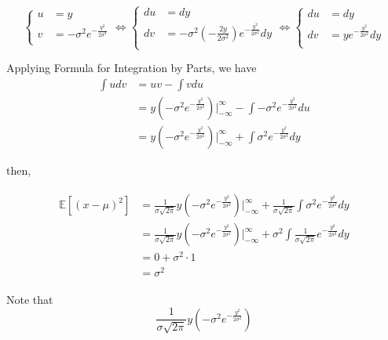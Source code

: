 \begin{equation}
    \begin{cases}
      u & = y\\
      v & = - \sigma ^ 2 e^{- \frac{y^2}{2 \sigma^2}}\\
    \end{cases}
    \Leftrightarrow
    \begin{cases}
      du & = dy\\
      dv & = - \sigma ^ 2 (-\frac{2y}{2 \sigma ^2}) e^{- \frac{y^2}{2 \sigma^2}}dy\\
    \end{cases}
    \Leftrightarrow
    \begin{cases}
      du & = dy\\
      dv & = y e^{- \frac{y^2}{2 \sigma^2}}dy\\
    \end{cases}
\end{equation}

Applying Formula for Integration by Parts, we have
\begin{equation}
    \begin{split}
        \int u dv & = u v - \int v du\\
        & = y (- \sigma ^ 2 e^{- \frac{y^2}{2 \sigma^2}})|_{- \infty}^{\infty} - \int - \sigma ^ 2 e^{- \frac{y^2}{2 \sigma^2}}du\\
        & = y (- \sigma ^ 2 e^{- \frac{y^2}{2 \sigma^2}})|_{- \infty}^{\infty} + \int \sigma ^ 2 e^{- \frac{y^2}{2 \sigma^2}}dy
    \end{split}
\end{equation}

then,

\begin{align}
    \begin{split}
        \mathbb{E}[(x - \mu)^2] & = \frac{1}{\sigma\sqrt{2\pi}}y (- \sigma ^ 2 e^{- \frac{y^2}{2 \sigma^2}})|_{- \infty}^{\infty} + \frac{1}{\sigma\sqrt{2\pi}}\int \sigma ^ 2 e^{- \frac{y^2}{2 \sigma^2}}dy\\
        & = \frac{1}{\sigma\sqrt{2\pi}}y (- \sigma ^ 2 e^{- \frac{y^2}{2 \sigma^2}})|_{- \infty}^{\infty} + \sigma ^ 2\int \frac{1}{\sigma\sqrt{2\pi}} e^{- \frac{y^2}{2 \sigma^2}}dy\\
        & = 0 + \sigma ^ 2 \cdot 1\\
        & = \sigma^2
    \end{split}
\end{align}

Note that 
$$
    \frac{1}{\sigma\sqrt{2\pi}}y (- \sigma ^ 2 e^{- \frac{y^2}{2 \sigma^2}})
$$

